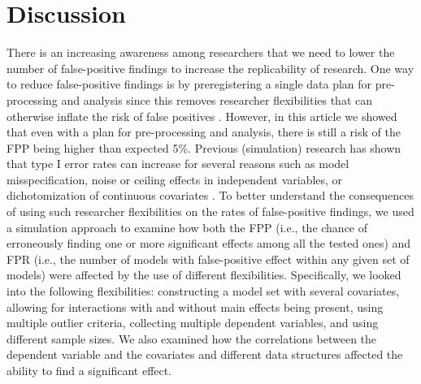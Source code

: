 \section{Discussion}
There is an increasing awareness among researchers that we need to lower the number of false-positive findings to increase the replicability of research. One way to reduce false-positive findings is by preregistering a single data plan for pre-processing and analysis since this removes researcher flexibilities that can otherwise inflate the risk of false positives \citep{Simmons2018}. However, in this article we showed that even with a plan for pre-processing and analysis, there is still a risk of the FPP being higher than expected 5\%. Previous (simulation) research has shown that type I error rates can increase for several reasons such as model misspecification, noise or ceiling effects in independent variables, or dichotomization of continuous covariates \citep{Dennis2019, Litiere2007, Brunner2009, Austin2003, Austin2004}. To better understand the consequences of using such researcher flexibilities on the rates of false-positive findings, we used a simulation approach to examine how both the FPP (i.e., the chance of erroneously finding one or more significant effects among all the tested ones) and FPR (i.e., the number of models with false-positive effect within any given set of models) were affected by the use of different flexibilities. Specifically, we looked into the following flexibilities: constructing a model set with several covariates, allowing for interactions with and without main effects being present, using multiple outlier criteria, collecting multiple dependent variables, and using different sample sizes. We also examined how the correlations between the dependent variable and the covariates and different data structures affected the ability to find a significant effect. \\

